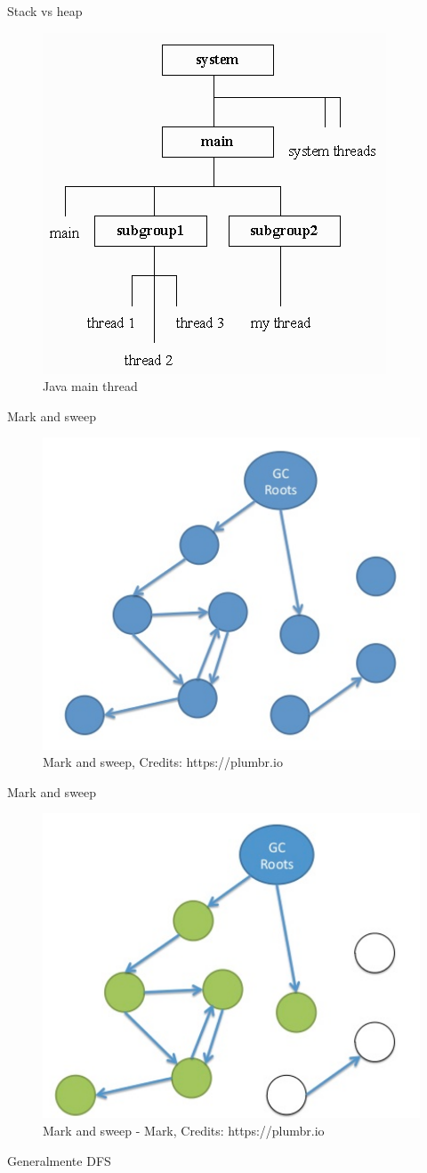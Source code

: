 \documentclass{beamer}
\begin{document}
\begin{frame}{Stack vs heap}
\begin{figure}
	\centering
	\includegraphics[width=0.6\linewidth]{Images/jthreads}
	\caption{Java main thread}
	\label{fig:jthreads}
\end{figure}

\end{frame}

\begin{frame}{Mark and sweep}
\begin{figure}
	\centering
	\includegraphics[width=0.6\linewidth]{Images/gc1}
	\caption{Mark and sweep, Credits: https://plumbr.io}
	\label{fig:markandsweep}
\end{figure}
\end{frame}

\begin{frame}{Mark and sweep}
\begin{figure}
	\centering
	\includegraphics[width=0.6\linewidth]{Images/gc2}
	\caption{Mark and sweep - Mark, Credits: https://plumbr.io}
	\label{fig:mark}
\end{figure}
Generalmente DFS
\end{frame}
\end{document}
